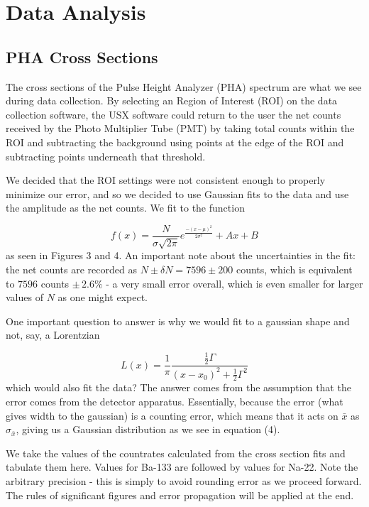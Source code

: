 \documentclass{article}
\begin{document}
\section{Data Analysis}
	\subsection{PHA Cross Sections}
		The cross sections of the Pulse Height Analyzer (PHA) spectrum are what we see during data collection.  By selecting an Region of Interest (ROI) on the data collection software, the USX software could return to the user the net counts received by the Photo Multiplier Tube (PMT) by taking total counts within the ROI and subtracting the background using points at the edge of the ROI and subtracting points underneath that threshold.

		\begin{flushleft}
		We decided that the ROI settings were not consistent enough to properly minimize our error, and so we decided to use Gaussian fits to the data and use the amplitude as the net counts.  We fit to the function
		\end{flushleft}
		\begin{equation}
			f(x) = \frac{N}{\sigma\sqrt{2\pi}}e^{\frac{-(x-\mu)^2}{2\sigma^2}} + Ax + B
		\end{equation}
		as seen in Figures 3 and 4.  An important note about the uncertainties in the fit: the net counts are recorded as $N \pm \delta N = 7596 \pm 200$ counts, which is equivalent to $7596$ counts $\pm \, 2.6\%$ - a very small error overall, which is even smaller for larger values of $N$ as one might expect.

		\begin{flushleft}
		One important question to answer is why we would fit to a gaussian shape and not, say, a Lorentzian
		\end{flushleft}
		\begin{equation*}
			L(x) = \frac{1}{\pi} \frac{\frac{1}{2}\Gamma}{(x-x_0)^2 + \frac{1}{2}\Gamma^2}
		\end{equation*}
		which would also fit the data?  The answer comes from the assumption that the error comes from the detector apparatus.  Essentially, because the error (what gives width to the gaussian) is a counting error, which means that it acts on $\bar{x}$ as $\sigma_{\bar{x}}$, giving us a Gaussian distribution as we see in equation (4).

		\begin{flushleft}
		We take the values of the countrates calculated from the cross section fits and tabulate them here.  Values for Ba-133 are followed by values for Na-22.  Note the arbitrary precision - this is simply to avoid rounding error as we proceed forward.  The rules of significant figures and error propagation will be applied at the end.
		\end{flushleft}
\end{document}
